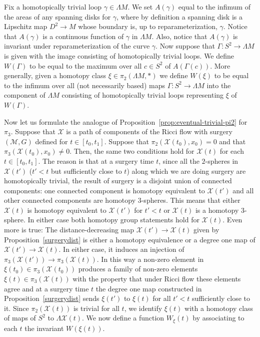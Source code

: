 \begin{definition}
\label{def:w-xi-spanning-disk-functional}
\label{Wdefn}
Fix a homotopically trivial loop $\gamma\in \Lambda M$. We set
$A(\gamma)$ equal to the infimum of the areas of any spanning disks
for $\gamma$, where by definition a spanning disk is a Lipschitz map
$D^2\to M$ whose boundary is, up to reparameterization, $\gamma$.
Notice that $A(\gamma)$ is a continuous function of $\gamma$ in
$\Lambda M$. Also, notice that $A(\gamma)$ is invariant under
reparameterization of the curve $\gamma$. Now suppose that
$\Gamma\colon S^2\to \Lambda M$ is given with the image consisting
of homotopically trivial loops.
 We define $W(\Gamma)$ to be equal to the maximum over all $c\in S^2$ of
$A(\Gamma(c))$. More generally, given a homotopy class $\xi\in \pi_2(\Lambda
M,*)$ we define $W(\xi)$ to be equal to the infimum over all (not necessarily
based) maps $\Gamma\colon S^2\to\Lambda M$ into the component of $\Lambda M$
consisting of homotopically trivial loops representing $\xi$ of $W(\Gamma)$.
\end{definition}




Now let us formulate the analogue of Proposition~\ref{prop:eventual-trivial-pi2} for
$\pi_3$. Suppose that ${\mathcal X}$ is a path of components of the
Ricci flow with surgery $({\mathcal M},G)$ defined for $t\in
[t_0,t_1]$. Suppose that $\pi_2({\mathcal X}(t_0),x_0)=0$ and that
$\pi_3({\mathcal X}(t_0),x_0)\not=0$. Then,  the same two conditions
hold for ${\mathcal X}(t)$ for each $t\in [t_0,t_1]$. The reason is
that at a surgery time $t$, since all the $2$-spheres in ${\mathcal
X}(t')$ ($t'<t$ but sufficiently close to $t$) along which we are
doing surgery are homotopically trivial, the result of surgery is a
disjoint union of connected components: one connected component is
homotopy equivalent to ${\mathcal X}(t')$ and all other connected
components are homotopy $3$-spheres. This means that either
${\mathcal X}(t)$ is homotopy equivalent to ${\mathcal X}(t')$ for
$t'<t$ or ${\mathcal X}(t)$ is a homotopy $3$-sphere. In either case
both homotopy group statements hold for ${\mathcal X}(t)$. Even more
is true: The distance-decreasing map ${\mathcal X}(t')\to {\mathcal
X}(t)$ given by Proposition~\ref{surgerydist} is either a homotopy
equivalence or a degree one map of ${\mathcal X}(t')\to {\mathcal
X}(t)$. In either case, it induces an injection of $\pi_3({\mathcal
X}(t'))\to \pi_3({\mathcal X}(t))$. In this way a non-zero element
in $\xi(t_0)\in\pi_3({\mathcal X}(t_0))$ produces a family of
non-zero elements $\xi(t)\in \pi_3({\mathcal X}(t))$ with the
property that under Ricci flow these elements agree and at a surgery
time $t$ the degree one map constructed in
Proposition~\ref{surgerydist} sends $\xi(t')$ to $\xi(t)$ for all
$t'<t$ sufficiently close to it. Since $\pi_2({\mathcal X}(t))$ is
trivial for all $t$, we identify $\xi(t)$ with a homotopy class of
maps of $S^2$ to $\Lambda {\mathcal X}(t)$. We now define a function
$W_\xi(t)$ by associating to each $t$ the invariant $W(\xi(t))$.

